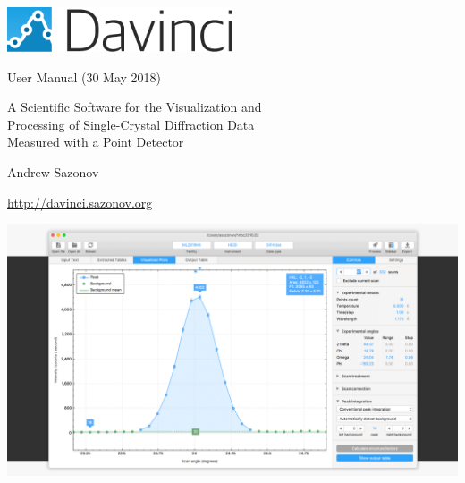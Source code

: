 \pagecolor{bgr}
\begin{titlepage}

\newcommand\tspace{\vspace*{1.7em}}

\centering

\tspace

\includegraphics[width=0.5\textwidth]{images/davinci-logo.pdf}

{\Large User Manual (30 May 2018)\par}

\tspace

{\LARGE A Scientific Software for the Visualization and\\ Processing of Single-Crystal Diffraction Data\\ Measured with a Point Detector\par}

\tspace

{\Large Andrew Sazonov\par}
{\Large \url{http://davinci.sazonov.org}}

\tspace

\hspace*{-2cm}\includegraphics[width=\paperwidth]{images/cover_image.png}

\vfill

\end{titlepage}
\pagecolor{white}




